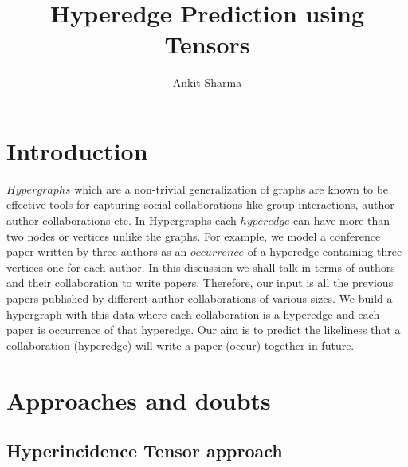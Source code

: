 \documentclass[a4paper,12pt]{article}
\title{Hyperedge Prediction using Tensors}
\author{Ankit Sharma}
\begin{document}
 
\maketitle


\section{Introduction}

\(Hypergraphs\) which are a non-trivial generalization of graphs are known to be effective tools for capturing social collaborations like group interactions, author-author collaborations etc. In Hypergraphs each $hyperedge$ can have more than two nodes or vertices unlike the graphs. For example, we model a conference paper written by three authors as an $occurrence$ of a hyperedge containing three vertices one for each author. In this discussion we shall talk in terms of authors and their collaboration to write papers. Therefore, our input is all the previous papers published by different author collaborations of various sizes. We build a hypergraph with this data where each collaboration is a hyperedge and each paper is occurrence of that hyperedge. Our aim is to predict the likeliness that a collaboration (hyperedge) will write a paper (occur) together in future. 

\section{Approaches and doubts}

\subsection{Hyperincidence Tensor approach}
\end{document}
